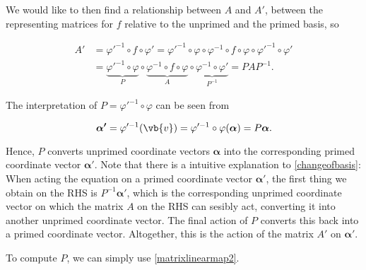 \documentclass[a4paper,12pt]{report}
\begin{document}
We would like to then find a relationship between \(A\) and \(A'\), \ie between the representing matrices for \(f\) relative to the unprimed and the primed basis, so

\begin{equation} \label{changeofbasis} 
    \begin{aligned}
        A' &= \varphi'^{-1} \circ f \circ \varphi' = \varphi'^{-1} \circ \varphi \circ \varphi^{-1} \circ f \circ \varphi \circ \varphi'^{-1} \circ \varphi' \\
           &= \underbrace{\varphi'^{-1} \circ \varphi}_{P} \circ \underbrace{\varphi^{-1} \circ f \circ \varphi}_{A} \circ \underbrace{\varphi^{-1} \circ \varphi'}_{P^{-1}} = P A P^{-1}.
    \end{aligned}
\end{equation}

The interpretation of \(P = \varphi '^{-1} \circ \varphi \) can be seen from 

\begin{equation}
    \boldsymbol{\alpha '} = \varphi '^{-1} (\vb{v} ) = \varphi '^{-1} \circ \varphi (\boldsymbol{\alpha } ) = P \boldsymbol{\alpha }.  
\end{equation}

Hence, \(P \) converts unprimed coordinate vectors \(\boldsymbol{\alpha } \) into the corresponding primed coordinate vector \(\boldsymbol{\alpha '} \). Note that there is a intuitive explanation to \cref{changeofbasis}: When acting the equation on  a primed coordinate vector \(\boldsymbol{\alpha '} \), the first thing we obtain on the RHS is \(P^{-1} \boldsymbol{\alpha '} \), which is the corresponding unprimed coordinate vector on which the matrix \(A\) on the RHS can sesibly act, converting it into another unprimed coordinate vector. The final action of \(P\) converts this back into a primed coordinate vector. Altogether, this is the action of the matrix \(A'\) on \(\boldsymbol{\alpha '} \). 

To compute \(P\), we can simply use \cref{matrixlinearmap2}.
\end{document}

